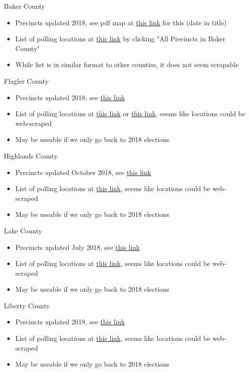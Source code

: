 \documentclass[12pt]{article}
\begin{document}
Baker County
\begin{itemize}
  \item Precincts updated 2018, see pdf map at \href{https://www.bakerelections.com/Portals/Baker/Documents/Precinct%20Map%202018.pdf}{this link} for this (date in title)
  \item List of polling locations at \href{https://www.bakerelections.com/m/Election-Information/Precinct-Finder}{this link} by clicking "All Precincts in Baker County"
  \item While list is in similar format to other counties, it does not seem scrapable
\end{itemize}
Flagler County
\begin{itemize}
  \item Precincts updated 2018, see \href{https://www.flaglerelections.com/For-Voters/District-Precinct-Maps}{this link}
  \item List of polling locations at \href{https://www.voterfocus.com/PrecinctFinder/precinctDirectory?county=FL-FLA}{this link} or \href{https://www.flaglerelections.com/For-Voters/Precinct-List}{this link},  seems like locations could be web-scraped
  \item May be useable if we only go back to 2018 elections
\end{itemize}
Highlands County
\begin{itemize}
  \item Precincts updated October 2018, see \href{https://www.votehighlands.com/Portals/Highlands/Documents/2018%20Precincts%20Map_092818.pdf?ver=2018-10-16-131000-593}{this link}
  \item List of polling locations at \href{https://www.voterfocus.com/PrecinctFinder/precinctDirectory?county=FL-HIG}{this link},  seems like locations could be web-scraped
  \item May be useable if we only go back to 2018 elections
\end{itemize}
Lake County
\begin{itemize}
  \item Precincts updated July 2018, see \href{https://www.lakecountyfl.gov/pdfs/gis/maps/VotingPrecincts_34x44-ADA.pdf}{this link}
  \item List of polling locations at \href{https://www.voterfocus.com/PrecinctFinder/precinctDirectory?county=FL-LAK}{this link},  seems like locations could be web-scraped
  \item May be useable if we only go back to 2018 elections
\end{itemize}
Liberty County
\begin{itemize}
  \item Precincts updated 2018, see \href{http://www.libertycad.com/wp-content/uploads/2018/11/2018-VP-MAP.pdf}{this link}
  \item List of polling locations at \href{https://www.voterfocus.com/PrecinctFinder/precinctDirectory?county=FL-LIB}{this link},  seems like locations could be web-scraped
  \item May be useable if we only go back to 2018 elections
\end{itemize}
\end{document}
